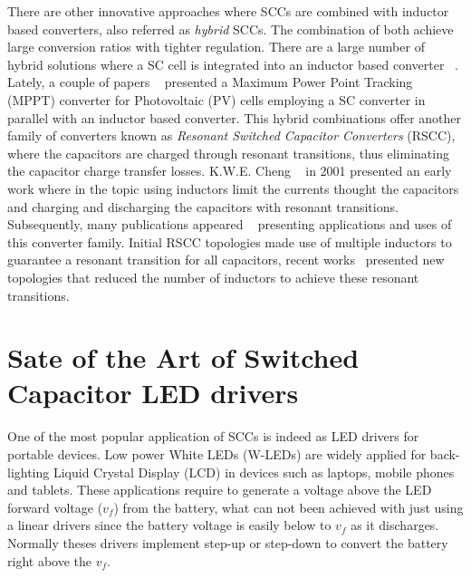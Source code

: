 There are other innovative approaches where SCCs are combined with inductor based converters, also referred as \emph{hybrid} SCCs. The combination of both achieve large conversion ratios with tighter regulation. There are a large number of hybrid solutions where a SC cell is integrated into an inductor based converter ~\cite{05Axelrod,08Axelrod, 11Mayo,11Miranda,12Kline}. Lately, a couple of papers ~\cite{12Zhigang,11Dazhong} presented a Maximum Power Point Tracking (MPPT) converter for Photovoltaic (PV) cells employing a SC converter in parallel with an inductor based converter. This hybrid combinations offer another family of converters known as \emph{Resonant Switched Capacitor Converters} (RSCC), where the capacitors are charged through resonant transitions, thus eliminating the capacitor charge transfer losses.  K.W.E. Cheng ~\cite{01Cheng} in 2001 presented an early  work where in the topic using inductors limit the currents thought the capacitors and charging and discharging the capacitors with resonant transitions.  Subsequently, many publications appeared ~\cite{05Lee,10Cao,11Gebben,07Shoyama} presenting applications and uses of this converter family. Initial RSCC topologies made use of multiple inductors to guarantee a resonant transition for all capacitors, recent works~\cite{13Kesarwani,13Schaef,14Kesarwani,15Schaef} presented new topologies that reduced the number of inductors to achieve these resonant transitions.


\section{Sate of the Art of Switched Capacitor LED drivers}

One of the most popular application of SCCs is indeed as LED drivers for portable devices. Low power White LEDs (W-LEDs) are widely applied for back-lighting Liquid Crystal Display (LCD) in devices such as laptops, mobile phones and tablets. These applications require to generate a voltage above the LED forward voltage ($v_f$) from the battery, what can not been achieved with just using a linear drivers since the battery voltage is easily below to $v_f$  as it discharges. Normally theses drivers implement step-up or step-down to convert the battery right above the $v_f$.

